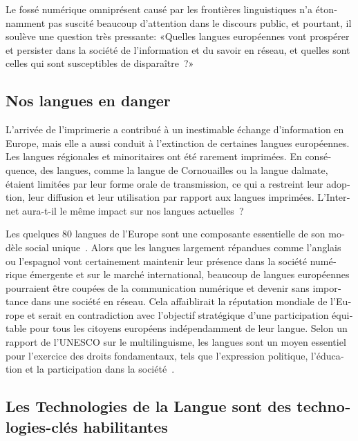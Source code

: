 \begin{french}
\begin{multicols}{2}

Le fossé numérique omniprésent causé par les frontières linguistiques
n'a étonnamment pas suscité beaucoup d'attention dans
le discours public, et pourtant, il soulève une question très
pressante: «Quelles langues européennes vont prospérer et persister
  dans la société de l'information et du savoir en réseau, et
  quelles sont celles qui sont susceptibles de disparaître~?»

\subsection{Nos langues en danger}

L'arrivée de l'imprimerie a contribué à un inestimable
échange d'information en Europe, mais elle a aussi conduit à
l'extinction de certaines langues européennes. Les langues
régionales et minoritaires ont été rarement imprimées. En conséquence,
des langues, comme la langue de Cornouailles ou la langue dalmate,
étaient limitées par leur forme orale de transmission, ce qui a
restreint leur adoption, leur diffusion et leur utilisation par
rapport aux langues imprimées. L'Internet aura-t-il le même
impact sur nos langues actuelles~?


Les quelques 80 langues de l'Europe sont une composante
essentielle de son modèle social unique~\cite{EC2}. Alors que les
langues largement répandues comme l'anglais ou l'espagnol vont certainement maintenir leur présence dans la société
numérique émergente et sur le marché international, beaucoup de
langues européennes pourraient être coupées de la communication
numérique et devenir sans importance dans une société en réseau. Cela
affaiblirait la réputation mondiale de l'Europe et serait en
contradiction avec l'objectif stratégique d'une
participation équitable pour tous les citoyens européens
indépendamment de leur langue. Selon un rapport de l'UNESCO
sur le multilinguisme, les langues sont un moyen essentiel pour
l'exercice des droits fondamentaux, tels que l'expression
politique, l'éducation et la participation dans la
société~\cite{UNESCO2007}.

\subsection{Les Technologies de la Langue sont des technologies-clés habilitantes}


\end{multicols}
\end{french}
